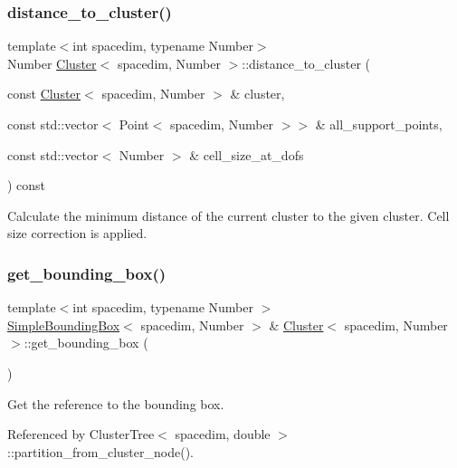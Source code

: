 \subsubsection{\texorpdfstring{distance\+\_\+to\+\_\+cluster()}{distance\_to\_cluster()}\hspace{0.1cm}{\footnotesize\ttfamily [2/2]}}
{\footnotesize\ttfamily template$<$int spacedim, typename Number$>$ \\
Number \hyperlink{classCluster}{Cluster}$<$ spacedim, Number $>$\+::distance\+\_\+to\+\_\+cluster (\begin{DoxyParamCaption}\item[{const \hyperlink{classCluster}{Cluster}$<$ spacedim, Number $>$ \&}]{cluster,  }\item[{const std\+::vector$<$ Point$<$ spacedim, Number $>$$>$ \&}]{all\+\_\+support\+\_\+points,  }\item[{const std\+::vector$<$ Number $>$ \&}]{cell\+\_\+size\+\_\+at\+\_\+dofs }\end{DoxyParamCaption}) const}

Calculate the minimum distance of the current cluster to the given cluster. Cell size correction is applied. \mbox{\label{classCluster_a062a81f89fcb644c98f94fdf20ebcced}} 
\subsubsection{\texorpdfstring{get\+\_\+bounding\+\_\+box()}{get\_bounding\_box()}\hspace{0.1cm}{\footnotesize\ttfamily [1/2]}}
{\footnotesize\ttfamily template$<$int spacedim, typename Number $>$ \\
\hyperlink{classSimpleBoundingBox}{Simple\+Bounding\+Box}$<$ spacedim, Number $>$ \& \hyperlink{classCluster}{Cluster}$<$ spacedim, Number $>$\+::get\+\_\+bounding\+\_\+box (\begin{DoxyParamCaption}{ }\end{DoxyParamCaption})}

Get the reference to the bounding box. 

Referenced by Cluster\+Tree$<$ spacedim, double $>$\+::partition\+\_\+from\+\_\+cluster\+\_\+node().

\mbox{\label{classCluster_ad720b2126e07c5698c1fc39ac3f1e6a4}} 
